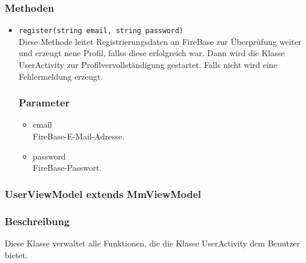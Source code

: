 \documentclass[a4paper]{scrreprt}
\begin{document}
\subsubsection*{Methoden}
\begin{addmargin}[25pt]{0pt}
\begin{itemize}

\item \texttt{register(string email, string password)}\\
	Diese Methode leitet Registrierungsdaten an FireBase zur Überprüfung weiter und erzeugt neue Profil, fallss diese erfolgreich war. Dann wird die Klasse UserActivity zur Profilvervollständigung gestartet. Falls nicht wird eine Fehlermeldung erzeugt.

	\subsubsection*{Parameter}
	\begin{itemize}
	\item email \\
		FireBase-E-Mail-Adresse.
	\item password \\
		FireBase-Passwort.
	\end{itemize}

\end{itemize}
\end{addmargin}	


\subsubsection{UserViewModel extends MmViewModel}
\subsubsection*{Beschreibung}
Diese Klasse verwaltet alle Funktionen, die die Klasse UserActivity dem Benutzer bietet.
\end{document}
